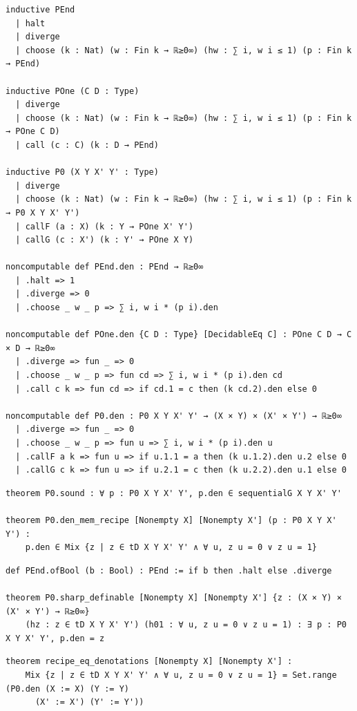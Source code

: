 \label{lean:proglang}
\begin{lstlisting}
inductive PEnd
  | halt
  | diverge
  | choose (k : Nat) (w : Fin k → ℝ≥0∞) (hw : ∑ i, w i ≤ 1) (p : Fin k → PEnd)

inductive POne (C D : Type)
  | diverge
  | choose (k : Nat) (w : Fin k → ℝ≥0∞) (hw : ∑ i, w i ≤ 1) (p : Fin k → POne C D)
  | call (c : C) (k : D → PEnd)

inductive P0 (X Y X' Y' : Type)
  | diverge
  | choose (k : Nat) (w : Fin k → ℝ≥0∞) (hw : ∑ i, w i ≤ 1) (p : Fin k → P0 X Y X' Y')
  | callF (a : X) (k : Y → POne X' Y')
  | callG (c : X') (k : Y' → POne X Y)

noncomputable def PEnd.den : PEnd → ℝ≥0∞
  | .halt => 1
  | .diverge => 0
  | .choose _ w _ p => ∑ i, w i * (p i).den

noncomputable def POne.den {C D : Type} [DecidableEq C] : POne C D → C × D → ℝ≥0∞
  | .diverge => fun _ => 0
  | .choose _ w _ p => fun cd => ∑ i, w i * (p i).den cd
  | .call c k => fun cd => if cd.1 = c then (k cd.2).den else 0

noncomputable def P0.den : P0 X Y X' Y' → (X × Y) × (X' × Y') → ℝ≥0∞
  | .diverge => fun _ => 0
  | .choose _ w _ p => fun u => ∑ i, w i * (p i).den u
  | .callF a k => fun u => if u.1.1 = a then (k u.1.2).den u.2 else 0
  | .callG c k => fun u => if u.2.1 = c then (k u.2.2).den u.1 else 0
\end{lstlisting}

\label{lean:proglang-sound}
\begin{lstlisting}
theorem P0.sound : ∀ p : P0 X Y X' Y', p.den ∈ sequentialG X Y X' Y'

theorem P0.den_mem_recipe [Nonempty X] [Nonempty X'] (p : P0 X Y X' Y') :
    p.den ∈ Mix {z | z ∈ tD X Y X' Y' ∧ ∀ u, z u = 0 ∨ z u = 1}
\end{lstlisting}

\label{lean:proglang-definable}
\begin{lstlisting}
def PEnd.ofBool (b : Bool) : PEnd := if b then .halt else .diverge

theorem P0.sharp_definable [Nonempty X] [Nonempty X'] {z : (X × Y) × (X' × Y') → ℝ≥0∞}
    (hz : z ∈ tD X Y X' Y') (h01 : ∀ u, z u = 0 ∨ z u = 1) : ∃ p : P0 X Y X' Y', p.den = z
\end{lstlisting}

\label{lean:proglang-eq}
\begin{lstlisting}
theorem recipe_eq_denotations [Nonempty X] [Nonempty X'] :
    Mix {z | z ∈ tD X Y X' Y' ∧ ∀ u, z u = 0 ∨ z u = 1} = Set.range (P0.den (X := X) (Y := Y)
      (X' := X') (Y' := Y'))
\end{lstlisting}

